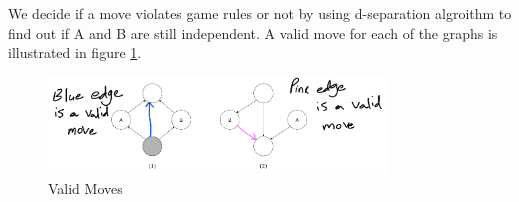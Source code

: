 \documentclass[en]{university}
\begin{document}
\setupdocument

\section{}

\subsection{}

We decide if a move violates game rules or not by using d-separation algroithm to find out 
if A and B are still independent. A valid move for each of the graphs is illustrated in 
figure \ref{fig:validmoves}.

\begin{figure}
    \centering
    \includegraphics[width=0.8\textwidth]{assets/1-a.png}
    \caption{Valid Moves}
    \label{fig:validmoves}
\end{figure}

\subsection{}
\end{document}
